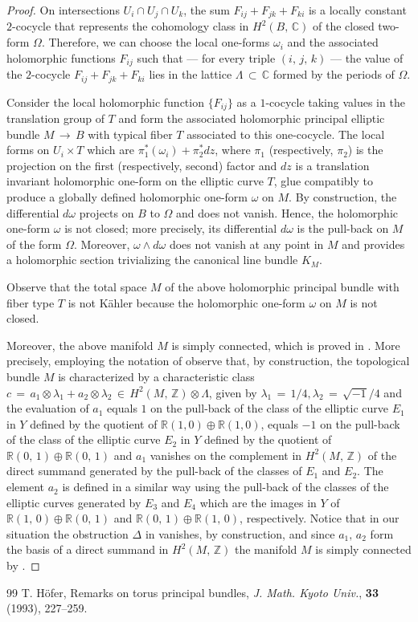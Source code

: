 \documentclass[10pt,a4paper]{amsart}
\begin{document}
\begin{proof}
On intersections $U_i \cap U_j \cap U_k$, the sum $F_{ij} +F_{jk}+F_{ki}$ is a locally constant $2$-cocycle 
that represents the cohomology class in $H^2(B,\, { \mathbb C})$ of the closed two-form $\Omega$. 
Therefore, we can choose the local one-forms $\omega_{i}$ and the associated holomorphic functions $F_{ij}$ 
such that --- for every triple $(i,\, j,\, k)$ --- the value of the $2$-cocycle $F_{ij}+F_{jk}+F_{ki}$ 
lies in the lattice $\Lambda \,\subset\, \mathbb C$ formed by the periods of $\Omega$.

Consider the local holomorphic function $\{F_{ij}\}$ as a $1$-cocycle taking values in the translation 
group of $T$ and form the associated holomorphic principal elliptic bundle $M \, \longrightarrow\, B$ with 
typical fiber $T$ associated to this one-cocycle. The local forms on $U_i \times T$ which are 
$\pi_1^*(\omega_i )+\pi_2^*dz $, where $\pi_1$ (respectively, $\pi_2$) is the projection on the first 
(respectively, second) factor and $d z$ is a translation invariant holomorphic one-form on the elliptic 
curve $T$, glue compatibly to produce a globally defined holomorphic one-form $\omega$ on $M$. By 
construction, the differential $d\omega$ projects on $B$ to $\Omega$ and does not vanish. Hence, the 
holomorphic one-form $\omega$ is not closed; more precisely, its differential $d \omega$ is the pull-back 
on $M$ of the form $\Omega$. Moreover, $\omega \wedge d \omega$ does not vanish at any point in $M$ and 
provides a holomorphic section trivializing the canonical line bundle $K_M$.

Observe that the total space $M$ of the above holomorphic principal bundle
with fiber type $T$ is not K\"ahler because the holomorphic one-form $\omega$ on $M$ is not closed.

Moreover, the above manifold $M$ is simply connected, which is proved in \cite[Theorem 12.3 and Remark 
12.4]{Ho}. More precisely, employing the notation of \cite{Ho} observe that, by construction, the 
topological bundle $M$ is characterized by a characteristic class $c\,=\, a_1 \otimes \lambda_1 + a_2 
\otimes \lambda_2 \,\in\, H^2(M,\, \mathbb Z) \otimes \Lambda$, given by $\lambda_1\,=\,1/4, \lambda_2\,=\, 
\sqrt{-1}/4$ and the evaluation of $a_1$ equals $1$ on the pull-back of the class of the elliptic curve 
$E_1$ in $Y$ defined by the quotient of $\mathbb R (1,0)\oplus \mathbb R (1,0)$, equals $-1$ on the 
pull-back of the class of the elliptic curve $E_2$ in $Y$ defined by the quotient of $\mathbb R 
(0,\,1)\oplus \mathbb R (0,\,1)$ and $a_1$ vanishes on the complement in $H^2(M,\, \mathbb Z)$ of the 
direct summand generated by the pull-back of the classes of $E_1$ and $E_2$. The element $a_2$ is defined 
in a similar way using the pull-back of the classes of the elliptic curves generated by $E_3$ and $E_4$ 
which are the images in $Y$ of $\mathbb R (1,\,0)\oplus \mathbb R (0,\,1)$ and $\mathbb R (0,\,1)\oplus 
\mathbb R (1,\,0)$, respectively. Notice that in our situation the obstruction $\Delta$ in 
\cite[Proposition 6.6 and Remark 12.4]{Ho} vanishes, by construction, and since $a_1,\, a_2$ form the basis 
of a direct summand in $H^2(M,\, \mathbb Z)$ the manifold $M$ is simply connected by \cite[Theorem 
12.3]{Ho}.
\end{proof}

\begin{thebibliography}{99}
 T. H\"ofer, Remarks on torus principal bundles, {\it J. Math. Kyoto Univ.}, {\bf 33} (1993), 227--259.
\end{thebibliography}
\end{document}

